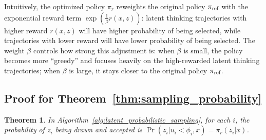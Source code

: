 \documentclass{article} %
\newtheorem{theorem}{Theorem}
\begin{document}
Intuitively, the optimized policy $\pi_{r}$ reweights the original policy $\pi_\text{ref}$ with the exponential reward term $\exp(\frac{1}{\beta}r(x, z))$: latent thinking trajectories with higher reward $r(x,z)$ will have higher probability of being selected, while trajectories with lower reward will have lower probability of being selected. The weight $\beta$ controls how strong this adjustment is: when $\beta$ is small, the policy becomes more ``greedy'' and focuses heavily on the high-rewarded latent thinking trajectories; when $\beta$ is large, it stays closer to the original policy $\pi_\text{ref}$.
\subsection{Proof for Theorem~\ref{thm:sampling_probability}}\label{appendix:sampling_probability_proof}
\begin{theorem}\label{thm:sampling_probability_appendix}
    In Algorithm~\ref{alg:latent_probabilistic_sampling}, for each $i$, the probability of $z_i$ being drawn and accepted is $\Pr(z_i|u_i<\phi_i,x)=\pi_{r}(z_i|x)$.
\end{theorem}
\end{document}
